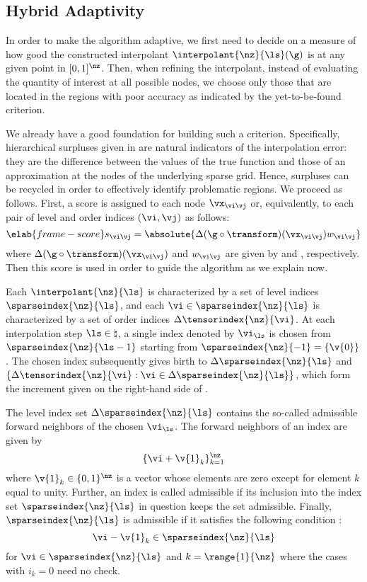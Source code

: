 \subsection{Hybrid Adaptivity}

In order to make the algorithm adaptive, we first need to decide on a measure of
how good the constructed interpolant $\interpolant{\nz}{\ls}(\g)$ is at any
given point in $[0, 1]^\nz$. Then, when refining the interpolant, instead of
evaluating the quantity of interest at all possible nodes, we choose only those
that are located in the regions with poor accuracy as indicated by the
yet-to-be-found criterion.

We already have a good foundation for building such a criterion. Specifically,
hierarchical surpluses given in  are natural
indicators of the interpolation error: they are the difference between the
values of the true function and those of an approximation at the nodes of the
underlying sparse grid. Hence, surpluses can be recycled in order to effectively
identify problematic regions. We proceed as follows. First, a score is assigned
to each node $\vx_{\vi \vj}$ or, equivalently, to each pair of level and order
indices $(\vi, \vj)$ as follows:
\begin{equation} \elab{frame-score}
  s_{\vi \vj} = \absolute{\Delta(\g \circ \transform)(\vx_{\vi \vj}) w_{\vi \vj}}
\end{equation}
where $\Delta(\g \circ \transform)(\vx_{\vi \vj})$ and $w_{\vi\vj}$ are given by
 and , respectively.
Then this score is used in order to guide the algorithm as we explain now.

Each $\interpolant{\nz}{\ls}$ is characterized by a set of level indices
$\sparseindex{\nz}{\ls}$, and each $\vi \in \sparseindex{\nz}{\ls}$ is
characterized by a set of order indices $\Delta\tensorindex{\nz}{\vi}$. At each
interpolation step $\ls \in \natural$, a single index denoted by $\vi_{\ls}$ is
chosen from $\sparseindex{\nz}{\ls - 1}$ starting from $\sparseindex{\nz}{-1} =
\{ \v{0} \}$. The chosen index subsequently gives birth to
$\Delta\sparseindex{\nz}{\ls}$ and $\{ \Delta\tensorindex{\nz}{\vi}: \vi \in
\Delta\sparseindex{\nz}{\ls} \}$, which form the increment given on the
right-hand side of .

The level index set $\Delta\sparseindex{\nz}{\ls}$ contains the so-called
admissible forward neighbors of the chosen $\vi_{\ls}$. The forward neighbors of
an index \vi are given by
\[
  \{ \vi + \v{1}_k \}_{k = 1}^\nz
\]
where $\v{1}_k \in \{ 0, 1 \}^\nz$ is a vector whose elements are zero except
for element $k$ equal to unity. Further, an index \vi is called admissible if
its inclusion into the index set $\sparseindex{\nz}{\ls}$ in question keeps the
set admissible. Finally, $\sparseindex{\nz}{\ls}$ is admissible if it satisfies
the following condition \cite{klimke2006}:
\[
  \vi - \v{1}_k \in \sparseindex{\nz}{\ls}
\]
for $\vi \in \sparseindex{\nz}{\ls}$ and $k = \range{1}{\nz}$ where the cases
with $i_k = 0$ need no check.

